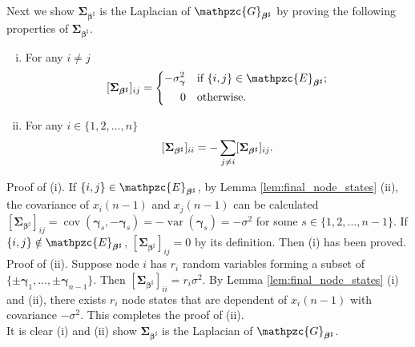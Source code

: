 \documentclass[a4paper, 11pt]{article}
\newcommand{\1}{\mathbf{1}}
\DeclareMathOperator{\var}{var}
\DeclareMathOperator{\cov}{cov}
\newcommand{\mGM}{\mathpzc{G}}
\newcommand{\mEM}{\mathpzc{E}}
\newcommand{\gammab}{{\bm \gamma}}
\newcommand{\betab}{\bm{\beta}}
\newcommand{\Sigmab}{\bm{\Sigma}}
\begin{document}
Next we show $\Sigmab_{\betab^\sharp}$ is the Laplacian of $\mGM_{\betab^\sharp}$ by proving the following properties of $\Sigmab_{\betab^\sharp}$.
\begin{enumerate}[(i)]
	\item For any $i\neq j$
	\begin{equation}\notag
	[\Sigmab_{\betab^\sharp}]_{ij}=\left\{
	\begin{aligned}
	-\sigma_{\gammab}^2\ \ &\textnormal{ if }\{i,j\}\in\mEM_{\betab^\sharp};\\
	0\ \ &\textnormal{ otherwise}.
	\end{aligned}
	\right.
	\end{equation}
	\item For any $i\in\{1,2,\dots,n\}$
	\begin{equation}\notag
	[\Sigmab_{\betab^\sharp}]_{ii} = -\sum\limits_{j\neq i}[\Sigmab_{\betab^\sharp}]_{ij}.
	\end{equation}
\end{enumerate}
Proof of (i). If $\{i,j\}\in\mEM_{\betab^\sharp}$, by Lemma \ref{lem:final_node_states} (ii), the covariance of $x_i(n-1 )$ and $x_j(n-1 )$ can be calculated $[\Sigmab_{\betab^\sharp}]_{ij}=\cov(\gammab_s,-\gammab_s)=-\var(\gammab_s)=-\sigma^2$ for some $s\in\{1,2,\dots,n-1 \}$. If $\{i,j\}\notin\mEM_{\betab^\sharp}$, $[\Sigmab_{\betab^\sharp}]_{ij}=0$ by its definition. Then (i) has been proved.\\
Proof of (ii). Suppose node $i$ has $r_i$ random variables forming a subset of $\{\pm\gammab_1,\dots,\pm\gammab_{n-1 }\}$. Then $[\Sigmab_{\betab^\sharp}]_{ii}=r_i\sigma^2$. By Lemma \ref{lem:final_node_states} (i) and (ii), there exists $r_i$ node states that are dependent of $x_i(n-1 )$ with covariance $-\sigma^2$. This completes the proof of (ii).\\
It is clear (i) and (ii) show $\Sigmab_{\betab^\sharp}$ is the Laplacian of $\mGM_{\betab^\sharp}$.





\end{document}
